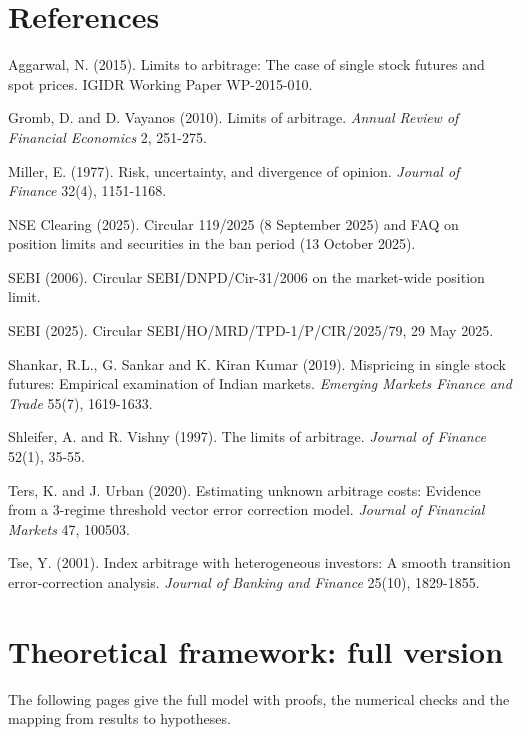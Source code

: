 \documentclass[11pt,a4paper]{article}
\begin{document}
\section*{References}
\small
\begin{description}[leftmargin=1.2em,itemsep=0pt,font=\normalfont]
\item Aggarwal, N. (2015). Limits to arbitrage: The case of single stock futures and spot prices. IGIDR Working Paper WP-2015-010.
\item Gromb, D. and D. Vayanos (2010). Limits of arbitrage. \emph{Annual Review of Financial Economics} 2, 251-275.
\item Miller, E. (1977). Risk, uncertainty, and divergence of opinion. \emph{Journal of Finance} 32(4), 1151-1168.
\item NSE Clearing (2025). Circular 119/2025 (8 September 2025) and FAQ on position limits and securities in the ban period (13 October 2025).
\item SEBI (2006). Circular SEBI/DNPD/Cir-31/2006 on the market-wide position limit.
\item SEBI (2025). Circular SEBI/HO/MRD/TPD-1/P/CIR/2025/79, 29 May 2025.
\item Shankar, R.L., G. Sankar and K. Kiran Kumar (2019). Mispricing in single stock futures: Empirical examination of Indian markets. \emph{Emerging Markets Finance and Trade} 55(7), 1619-1633.
\item Shleifer, A. and R. Vishny (1997). The limits of arbitrage. \emph{Journal of Finance} 52(1), 35-55.
\item Ters, K. and J. Urban (2020). Estimating unknown arbitrage costs: Evidence from a 3-regime threshold vector error correction model. \emph{Journal of Financial Markets} 47, 100503.
\item Tse, Y. (2001). Index arbitrage with heterogeneous investors: A smooth transition error-correction analysis. \emph{Journal of Banking and Finance} 25(10), 1829-1855.
\end{description}

\appendix
\clearpage
\section{Theoretical framework: full version}\label{app:model}
The following pages give the full model with proofs, the numerical checks and the mapping from results to hypotheses.

\end{document}
